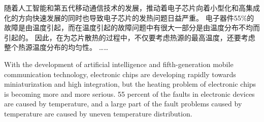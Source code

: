 

\begin{chineseabstract}
    随着人工智能和第五代移动通信技术的发展，推动着电子芯片向着小型化和高集成化的方向快速发展的同时也导致电子芯片的发热问题日益严重。
    电子器件55\%的故障是由温度引起，而在温度引起的故障问题中有很大一部分是由温度分布不均而引起的。
    因此，在为芯片散热的过程中，不仅要考虑热源的最高温度，还要考虑整个热源温度分布的均匀性。
……

\end{chineseabstract}

\begin{englishabstract}
    With the development of artificial intelligence and fifth-generation mobile communication technology, electronic chips are developing rapidly towards miniaturization and high integration, but the heating problem of electronic chips is becoming more and more serious.
    55 percent of the faults in electronic devices are caused by temperature, and a large part of the fault problems caused by temperature are caused by uneven temperature distribution.

\end{englishabstract}